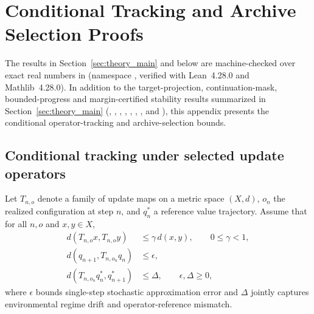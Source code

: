 \section{Conditional Tracking and Archive Selection Proofs}
\label{sec:theory}
\label{app:lean}

The results in Section~\ref{sec:theory_main} and below are machine-checked over
exact real numbers in  (namespace
, verified with Lean~4.28.0 and Mathlib~4.28.0).
In addition to the target-projection, continuation-mask, bounded-progress and
margin-certified stability results summarized in Section~\ref{sec:theory_main}
(, ,
, ,
, ,
,  and
), this appendix presents the conditional operator-tracking
and archive-selection bounds.

\subsection{Conditional tracking under selected update operators}
\label{app:tracking_current}

Let $T_{n,o}$ denote a family of update maps on a metric space $(X, d)$, $o_n$
the realized configuration at step $n$, and $q_n^*$ a reference value trajectory.
Assume that for all $n, o$ and $x, y \in X$,
\begin{align}
 d(T_{n,o}x, T_{n,o}y) &\leq \gamma\,d(x,y),\qquad 0 \leq \gamma < 1,\nonumber\\
 d(q_{n+1}, T_{n,o_n}q_n) &\leq \epsilon,\nonumber\\
 d(T_{n,o_n}q_n^*, q_{n+1}^*) &\leq \Delta,
 \qquad \epsilon, \Delta \geq 0,
 \label{eq:tracking_assumptions}
\end{align}
where $\epsilon$ bounds single-step stochastic approximation error and $\Delta$
jointly captures environmental regime drift and operator-reference mismatch.

